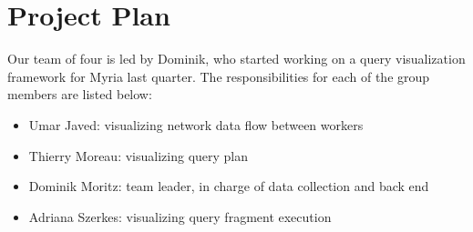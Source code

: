 \section{Project Plan}

Our team of four is led by Dominik, who started working on a query visualization framework for Myria last quarter. The responsibilities for each of the group members are listed below:

\begin {itemize}
    \item Umar Javed: visualizing network data flow between workers
    \item Thierry Moreau: visualizing query plan
    \item Dominik Moritz: team leader, in charge of data collection and back end
    \item Adriana Szerkes: visualizing query fragment execution
\end{itemize}

